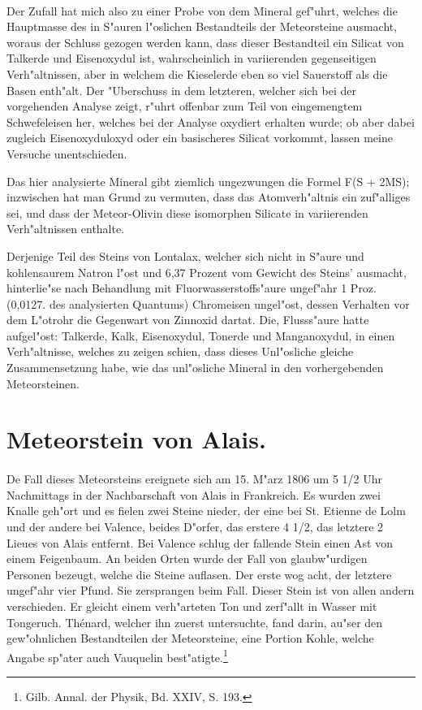 \documentclass[a4paper, 11pt, oneside]{article}
\begin{document}
\paragraph{}
Der Zufall hat mich also zu einer Probe von dem Mineral gef"uhrt, welches die Hauptmasse des in S"auren l"oslichen Bestandteils der Meteorsteine ausmacht, woraus der Schluss gezogen werden kann, dass dieser Bestandteil ein Silicat von Talkerde und Eisenoxydul ist, wahrscheinlich in variierenden gegenseitigen Verh"altnissen, aber in welchem die Kieselerde eben so viel Sauerstoff als die Basen enth"alt. Der "Uberschuss in dem letzteren, welcher sich bei der vorgehenden Analyse zeigt, r"uhrt offenbar zum Teil von eingemengtem Schwefeleisen her, welches bei der Analyse oxydiert erhalten wurde; ob aber dabei zugleich Eisenoxyduloxyd oder ein basischeres Silicat vorkommt, lassen meine Versuche unentschieden.

Das hier analysierte Mineral gibt ziemlich ungezwungen die Formel F(S + 2MS); inzwischen hat man Grund zu vermuten, dass das Atomverh"altnis ein zuf"alliges sei, und dass der Meteor-Olivin diese isomorphen Silicate in variierenden Verh"altnissen enthalte.

Derjenige Teil des Steins von Lontalax, welcher sich nicht in S"aure und kohlensaurem Natron l"ost und 6,37 Prozent vom Gewicht des Steins’ ausmacht, hinterlie"se nach Behandlung mit Fluorwasserstoffs"aure ungef"ahr 1 Proz. (0,0127. des analysierten Quantums) Chromeisen ungel"ost, dessen Verhalten vor dem L"otrohr die Gegenwart von Zinnoxid dartat. Die, Flusss"aure hatte aufgel"ost: Talkerde, Kalk, Eisenoxydul, Tonerde und Manganoxydul, in einen Verh"altnisse, welches zu zeigen schien, dass dieses Unl"osliche gleiche Zusammensetzung habe, wie das unl"osliche Mineral in den vorhergebenden Meteorsteinen.

\section{Meteorstein von Alais.}
\paragraph{}
De Fall dieses Meteorsteins ereignete sich am 15. M"arz 1806 um 5 1/2 Uhr Nachmittags in der Nachbarschaft von Alais in Frankreich. Es wurden zwei Knalle geh"ort und es fielen zwei Steine nieder, der eine bei St. Etienne de Lolm und der andere bei Valence, beides D"orfer, das erstere 4 1/2, das letztere 2 Lieues von Alais entfernt. Bei Valence schlug der fallende Stein einen Ast von einem Feigenbaum. An beiden Orten wurde der Fall von glaubw"urdigen Personen bezeugt, welche die Steine auflasen. Der erste wog acht, der letztere ungef"ahr vier Pfund. Sie zersprangen beim Fall. Dieser Stein ist von allen andern verschieden. Er gleicht einem verh"arteten Ton und zerf"allt in Wasser mit Tongeruch. Thénard, welcher ihn zuerst untersuchte, fand darin, au"ser den gew"ohnlichen Bestandteilen der Meteorsteine, eine Portion Kohle, welche Angabe sp"ater auch Vauquelin best"atigte.\footnote{Gilb. Annal. der Physik, Bd. XXIV, S. 193.}
\end{document}
